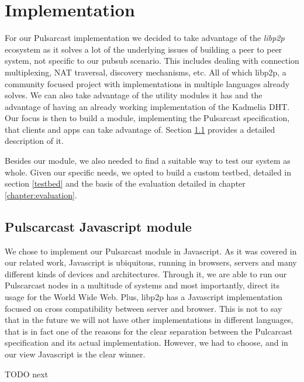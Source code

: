 
\chapter{Implementation}
\label{chapter:implementation}

For our Pulsarcast implementation we decided to take advantage of the
\emph{libp2p} ecosystem as it solves a lot of the underlying issues of building
a peer to peer system, not specific to our pubsub scenario. This includes
dealing with connection multiplexing, NAT traversal, discovery mechanisms, etc.
All of which libp2p, a community focused project with implementations in
multiple languages already solves. We can also take advantage of the utility
modules it has and the advantage of having an already working implementation of
the Kadmelia DHT. Our focus is then to build a module, implementing the
Pulsarcast specification, that clients and apps can take advantage of. Section
\ref{pulsarcast-javascript-module} provides a detailed description of it.

Besides our module, we also needed to find a suitable way to test our system as
whole. Given our specific needs, we opted to build a custom testbed, detailed
in section \ref{testbed} and the basis of the evaluation detailed in chapter
\ref{chapter:evaluation}. 

\section{Pulscarcast Javascript module}\label{pulsarcast-javascript-module}

We chose to implement our Pulsarcast module in Javascript. As it was covered in
our related work, Javascript is ubiquitous, running in browsers, servers and
many different kinds of devices and architectures. Through it, we are able to
run our Pulscarcast nodes in a multitude of systems and most importantly,
direct its usage for the World Wide Web. Plus, libp2p has a Javascript
implementation focused on cross compatibility between server and browser. This
is not to say that in the future we will not have other implementations in
different languages, that is in fact one of the reasons for the clear
separation between the Pulcarcast specification and its actual implementation.
However, we had to choose, and in our view Javascript is the clear winner.

TODO next

